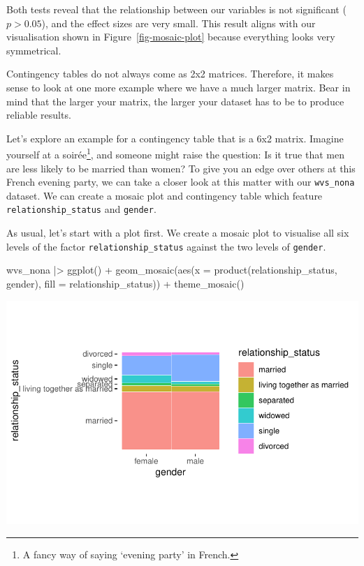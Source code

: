 \documentclass[
  letterpaper,
  DIV=11,
  numbers=noendperiod]{scrreprt}
\newenvironment{Shaded}{\begin{snugshade}}{\end{snugshade}}
\newcommand{\AttributeTok}[1]{\textcolor[rgb]{0.40,0.45,0.13}{#1}}
\newcommand{\FunctionTok}[1]{\textcolor[rgb]{0.28,0.35,0.67}{#1}}
\newcommand{\NormalTok}[1]{\textcolor[rgb]{0.00,0.23,0.31}{#1}}
\newcommand{\SpecialCharTok}[1]{\textcolor[rgb]{0.37,0.37,0.37}{#1}}
\begin{document}
Both tests reveal that the relationship between our variables is not
significant (\(p > 0.05\)), and the effect sizes are very small. This
result aligns with our visualisation shown in
Figure~\ref{fig-mosaic-plot} because everything looks very symmetrical.

Contingency tables do not always come as 2x2 matrices. Therefore, it
makes sense to look at one more example where we have a much larger
matrix. Bear in mind that the larger your matrix, the larger your
dataset has to be to produce reliable results.

Let's explore an example for a contingency table that is a 6x2 matrix.
Imagine yourself at a soirée\footnote{A fancy way of saying `evening
  party' in French.}, and someone might raise the question: Is it true
that men are less likely to be married than women? To give you an edge
over others at this French evening party, we can take a closer look at
this matter with our \texttt{wvs\_nona} dataset. We can create a mosaic
plot and contingency table which feature \texttt{relationship\_status}
and \texttt{gender}.

As usual, let's start with a plot first. We create a mosaic plot to
visualise all six levels of the factor \texttt{relationship\_status}
against the two levels of \texttt{gender}.

\begin{Shaded}
\begin{Highlighting}[]
\NormalTok{wvs\_nona }\SpecialCharTok{|\textgreater{}}
  \FunctionTok{ggplot}\NormalTok{() }\SpecialCharTok{+}
  \FunctionTok{geom\_mosaic}\NormalTok{(}\FunctionTok{aes}\NormalTok{(}\AttributeTok{x =} \FunctionTok{product}\NormalTok{(relationship\_status, gender),}
                  \AttributeTok{fill =}\NormalTok{ relationship\_status)) }\SpecialCharTok{+}
  \FunctionTok{theme\_mosaic}\NormalTok{()}
\end{Highlighting}
\end{Shaded}

\includegraphics{11_group_comparison_files/figure-pdf/contigency-tbl-plot-relationship-status-gender-1.pdf}
\end{document}
